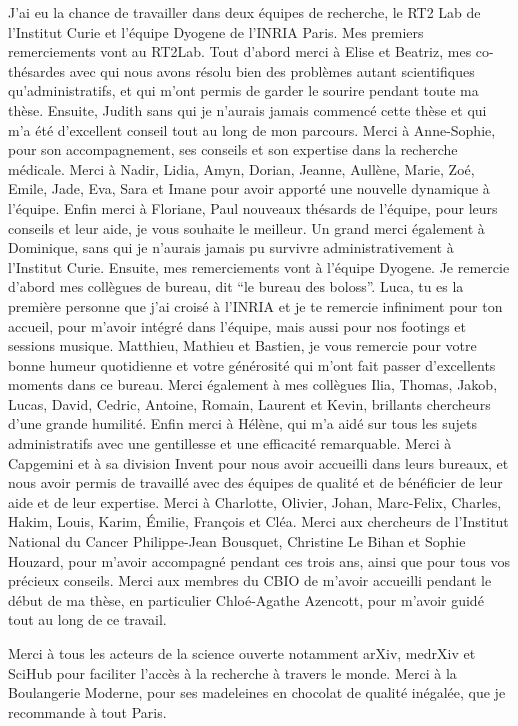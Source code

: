 J'ai eu la chance de travailler dans deux équipes de recherche, le RT2 Lab de
l'Institut Curie et l'équipe Dyogene de l'INRIA Paris. Mes premiers
remerciements vont au RT2Lab. Tout d'abord merci à Elise et Beatriz, mes
co-thésardes avec qui nous avons résolu bien des problèmes autant scientifiques
qu'administratifs, et qui m'ont permis de garder le sourire pendant toute ma
thèse. Ensuite, Judith sans qui je n'aurais jamais commencé cette thèse et qui
m'a été d'excellent conseil tout au long de mon parcours. Merci à Anne-Sophie,
pour son accompagnement, ses conseils et son expertise dans la recherche
médicale. Merci à Nadir, Lidia, Amyn, Dorian, Jeanne, Aullène, Marie, Zoé,
Emile, Jade, Eva, Sara et Imane pour avoir apporté une nouvelle dynamique à
l'équipe. Enfin merci à Floriane, Paul nouveaux thésards de l'équipe, pour leurs
conseils et leur aide, je vous souhaite le meilleur. Un grand merci également à
Dominique, sans qui je n'aurais jamais pu survivre administrativement à
l'Institut Curie. Ensuite, mes remerciements vont à l'équipe Dyogene. Je
remercie d'abord mes collègues de bureau, dit ``le bureau des boloss''. Luca, tu
es la première personne que j'ai croisé à l'INRIA et je te remercie infiniment
pour ton accueil, pour m'avoir intégré dans l'équipe, mais aussi pour nos
footings et sessions musique. Matthieu, Mathieu et Bastien, je vous remercie
pour votre bonne humeur quotidienne et votre générosité qui m'ont fait passer
d'excellents moments dans ce bureau. Merci également à mes collègues Ilia,
Thomas, Jakob, Lucas, David, Cedric, Antoine, Romain, Laurent et Kevin,
brillants chercheurs d'une grande humilité. Enfin merci à Hélène, qui m'a aidé
sur tous les sujets administratifs avec une gentillesse et une efficacité
remarquable.
Merci à Capgemini et à sa division Invent pour nous avoir accueilli dans
leurs bureaux, et nous avoir permis de travaillé avec des équipes de qualité et
de bénéficier de leur aide et de leur expertise. Merci à Charlotte, Olivier,
Johan, Marc-Felix, Charles, Hakim, Louis, Karim, Émilie, François et Cléa.
Merci aux chercheurs de l'Institut National du Cancer Philippe-Jean
Bousquet, Christine Le Bihan et Sophie Houzard, pour m'avoir accompagné
pendant ces trois ans, ainsi que pour tous vos précieux conseils.
Merci aux membres du CBIO de m'avoir accueilli pendant le début de ma thèse,
en particulier Chloé-Agathe Azencott, pour m'avoir guidé tout au long de ce
travail.

Merci à tous les acteurs de la science ouverte notamment arXiv, medrXiv et
SciHub pour faciliter l'accès à la recherche à travers le monde. Merci à la
Boulangerie Moderne, pour ses madeleines en chocolat de qualité inégalée,
que je recommande à tout Paris.

